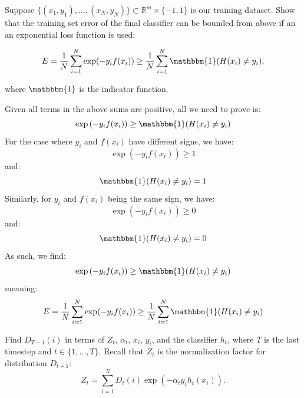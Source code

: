 Suppose $\{(x_1, y_1), ..., (x_N, y_N)\} \subset \mathbb{R}^m \times \{-1,1\}$ is our training dataset.  Show that the training set error of the final classifier can be bounded from
above if an an exponential loss function is used:

$$E = \frac{1}{N} \sum\limits_{i=1}^N \exp(-y_{i}f(x_i)) \geq \frac{1}{N} \sum\limits_{i=1}^N \mathbbm{1}(H(x_i) \neq y_i),$$

where $\mathbbm{1}$ is the indicator function.

\begin{solution}
 Given all terms in the above sums are positive, all we need to prove is:
 \begin{equation}
     \exp{(-y_if(x_i))}\geq \mathbbm{1}(H(x_i)\neq y_i)
 \end{equation}
 For the case where $y_i$ and $f(x_i)$ have different signs, we have:
 \begin{equation}
    \exp{(-y_if(x_i))}\geq 1
 \end{equation}
 and:
 \begin{equation}
    \mathbbm{1}(H(x_i)\neq y_i)=1
 \end{equation}
 Similarly, for $y_i$ and $f(x_i)$ being the same sign, we have:
 \begin{equation}
    \exp{(-y_if(x_i))}\geq 0
 \end{equation}
 and:
 \begin{equation}
    \mathbbm{1}(H(x_i)\neq y_i)=0
 \end{equation}
 As such, we find:
 \begin{equation}
    \exp{(-y_if(x_i))}\geq \mathbbm{1}(H(x_i)\neq y_i)
 \end{equation}
 meaning:
 \begin{equation}
    E = \frac{1}{N} \sum\limits_{i=1}^N \exp(-y_{i}f(x_i)) \geq \frac{1}{N} \sum\limits_{i=1}^N \mathbbm{1}(H(x_i) \neq y_i)
 \end{equation}
\end{solution}

\problem[3]
Find $D_{T + 1}(i)$ in terms of $Z_t$, $\alpha_t$, $x_i$, $y_i$, and the classifier $h_t$, where $T$ is the last timestep and $t \in \{1, \ldots, T\}$. Recall that $Z_t$ is the normalization factor for distribution $D_{t+1}$:
$$Z_t = \sum\limits_{i=1}^N D_t(i) \exp(-\alpha_{t}y_{i}h_{t}(x_{i})).$$

